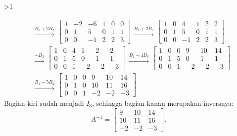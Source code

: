 \documentclass[12pt]{article}
\newenvironment{soaljawab}[1]{%
    \ifnum#1>1\clearpage\fi
    \begin{tcolorbox}[enhanced,breakable,height fill,height fixed for=all,
        sharp corners,colback=white,colframe=black,boxrule=0.4bp,
        boxsep=0pt,left=12bp,right=12bp,top=6bp,bottom=10bp,
        before skip=0pt,after skip=0pt,pad at break=8bp]
    \fontsize{12bp}{14bp}\selectfont
    \setlength{\abovedisplayskip}{8bp}
    \setlength{\belowdisplayskip}{8bp}
    \setlength{\abovedisplayshortskip}{8bp}
    \setlength{\belowdisplayshortskip}{8bp}
    \renewcommand{\arraystretch}{1.15}
    \begin{enumerate}[start=#1,topsep=0pt]
}{%
    \end{enumerate}
    \end{tcolorbox}
}
\begin{document}
\begin{soaljawab}{5}
{\begin{align*}
    & \begin{array}{c}\xrightarrow{B_3+2B_2}\end{array}
        \left[\begin{array}{ccc|ccc}
            1 & -2 & -6 & 1 & 0 & 0 \\
            0 & 1 & 5 & 0 & 1 & 1 \\
            0 & 0 & -1 & 2 & 2 & 3
        \end{array}\right]
        \begin{array}{c}\xrightarrow{B_1+2B_2}\end{array}
        \left[\begin{array}{ccc|ccc}
            1 & 0 & 4 & 1 & 2 & 2 \\
            0 & 1 & 5 & 0 & 1 & 1 \\
            0 & 0 & -1 & 2 & 2 & 3
        \end{array}\right] \\[6bp]
    & \begin{array}{c}\xrightarrow{-B_3}\end{array}
        \left[\begin{array}{ccc|ccc}
            1 & 0 & 4 & 1 & 2 & 2 \\
            0 & 1 & 5 & 0 & 1 & 1 \\
            0 & 0 & 1 & -2 & -2 & -3
        \end{array}\right]
        \begin{array}{c}\xrightarrow{B_1-4B_3}\end{array}
        \left[\begin{array}{ccc|ccc}
            1 & 0 & 0 & 9 & 10 & 14 \\
            0 & 1 & 5 & 0 & 1 & 1 \\
            0 & 0 & 1 & -2 & -2 & -3
        \end{array}\right] \\[6bp]
    & \begin{array}{c}\xrightarrow{B_2-5B_3}\end{array}
        \left[\begin{array}{ccc|ccc}
            1 & 0 & 0 & 9 & 10 & 14 \\
            0 & 1 & 0 & 10 & 11 & 16 \\
            0 & 0 & 1 & -2 & -2 & -3
        \end{array}\right]
\end{align*}}
Bagian kiri sudah menjadi $I_3$, sehingga bagian kanan merupakan inversnya:
\[
    A^{-1} = \begin{bmatrix}
            9 & 10 & 14 \\
            10 & 11 & 16 \\
            -2 & -2 & -3
        \end{bmatrix}.
\]
\end{soaljawab}
\end{document}
